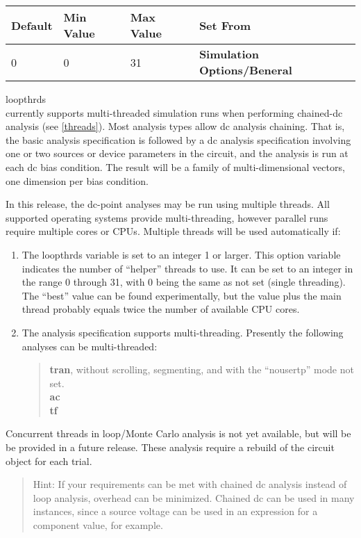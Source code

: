 \begin{description}
\begin{tabular}{|l|l|l|l|}\hline
\bf Default & \bf Min Value & \bf Max Value & \bf Set From\\ \hline
0 & 0 & 31 & \bf Simulation Options/Beneral\\ \hline
\end{tabular}

\item{\et loopthrds}\\
{\WRspice} currently supports multi-threaded simulation runs when
performing chained-dc analysis (see \ref{threads}).  Most analysis
types allow dc analysis chaining.  That is, the basic analysis
specification is followed by a dc analysis specification involving one
or two sources or device parameters in the circuit, and the analysis
is run at each dc bias condition.  The result will be a family of
multi-dimensional vectors, one dimension per bias condition.

In this release, the dc-point analyses may be run using multiple
threads.  All supported operating systems provide multi-threading,
however parallel runs require multiple cores or CPUs.  Multiple
threads will be used automatically if:

\begin{enumerate}
\item{The {\et loopthrds} variable is set to an integer 1 or larger. 
This option variable indicates the number of ``helper'' threads to
use.  It can be set to an integer in the range 0 through 31, with 0
being the same as not set (single threading).  The ``best'' value can
be found experimentally, but the value plus the main thread probably
equals twice the number of available CPU cores.}

\item{The analysis specification supports multi-threading.  Presently
the following analyses can be multi-threaded:
\begin{quote}
{\bf tran}, without scrolling, segmenting, and with the ``nousertp''
    mode not set.\\
{\bf ac}\\
{\bf tf}
\end{quote}}
\end{enumerate}

Concurrent threads in loop/Monte Carlo analysis is not yet available,
but will be be provided in a future release.  These analysis require a
rebuild of the circuit object for each trial.

\begin{quote}
Hint:  If your requirements can be met with chained dc analysis
instead of loop analysis, overhead can be minimized.  Chained dc can
be used in many instances, since a source voltage can be used in an
expression for a component value, for example.
\end{quote}


\end{description}
